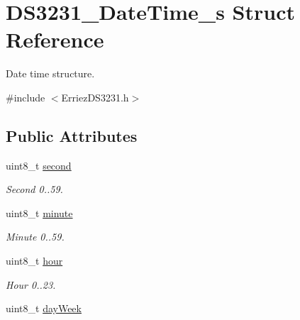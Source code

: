 \hypertarget{struct_d_s3231___date_time__s}{}\section{D\+S3231\+\_\+\+Date\+Time\+\_\+s Struct Reference}
\label{struct_d_s3231___date_time__s}


Date time structure.  




{\ttfamily \#include $<$Erriez\+D\+S3231.\+h$>$}

\subsection*{Public Attributes}
\begin{DoxyCompactItemize}
\item 
uint8\+\_\+t \hyperlink{struct_d_s3231___date_time__s_ad023b19951e1bf1d2c8ff5a1a26a30d1}{second}\hypertarget{struct_d_s3231___date_time__s_ad023b19951e1bf1d2c8ff5a1a26a30d1}{}\label{struct_d_s3231___date_time__s_ad023b19951e1bf1d2c8ff5a1a26a30d1}

\begin{DoxyCompactList}\small\item\em Second 0..59. \end{DoxyCompactList}\item 
uint8\+\_\+t \hyperlink{struct_d_s3231___date_time__s_a1cea87cbb6606e5259ce7aadf068eb85}{minute}\hypertarget{struct_d_s3231___date_time__s_a1cea87cbb6606e5259ce7aadf068eb85}{}\label{struct_d_s3231___date_time__s_a1cea87cbb6606e5259ce7aadf068eb85}

\begin{DoxyCompactList}\small\item\em Minute 0..59. \end{DoxyCompactList}\item 
uint8\+\_\+t \hyperlink{struct_d_s3231___date_time__s_a7993110a1e27a217b2756d35ede55fc7}{hour}\hypertarget{struct_d_s3231___date_time__s_a7993110a1e27a217b2756d35ede55fc7}{}\label{struct_d_s3231___date_time__s_a7993110a1e27a217b2756d35ede55fc7}

\begin{DoxyCompactList}\small\item\em Hour 0..23. \end{DoxyCompactList}\item 
uint8\+\_\+t \hyperlink{struct_d_s3231___date_time__s_a29786860ba13a2fc3ac823752c18ef70}{day\+Week}\hypertarget{struct_d_s3231___date_time__s_a29786860ba13a2fc3ac823752c18ef70}{}\label{struct_d_s3231___date_time__s_a29786860ba13a2fc3ac823752c18ef70}


\end{DoxyCompactItemize}
